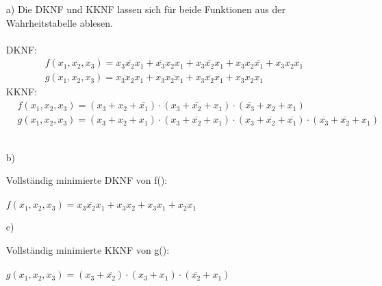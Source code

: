 \documentclass{article}
\begin{document}
	\begin{itemize}
		\item[a)] Die DKNF und KKNF lassen sich für beide Funktionen aus der Wahrheitstabelle ablesen.\\\\
		DKNF:
		\begin{align*}
			&f(x_1,x_2,x_3)=\overline{x_3x_2x_1} + \overline{x_3}x_2x_1 + x_3\overline{x_2}x_1 + x_3x_2\overline{x_1} + x_3x_2x_1 \\
			&g(x_1,x_2,x_3)=\overline{x_3x_2}x_1 + x_3\overline{x_2x_1} + x_3\overline{x_2}x_1 + x_3x_2x_1
		\end{align*}
		KKNF:
		\begin{align*}
			&f(x_1,x_2,x_3)=(x_3+ x_2+\overline{x_1}) \cdot (x_3 +\overline{x_2}+ x_1) \cdot (\overline{x_3}+ x_2 + x_1) \\
			&g(x_1,x_2,x_3)=(x_3 + x_2 + x_1) \cdot (x_3 + \overline{x_2} + x_1) \cdot (x_3 + \overline{x_2} + \overline{x_1}) \cdot (\overline{x_3} + \overline{x_2} + x_1)
		\end{align*}\\
		\item[b)]
		\begin{minipage}[t]{0.45\textwidth}
			Vollständig minimierte DKNF von f(): \\\\
			$f(x_1,x_2,x_3)=\overline{x_3x_2x_1} + x_3x_2 + x_3x_1 + x_2x_1$
		\end{minipage}
		\begin{minipage}[h]{0.5\textwidth}
			\begin{karnaugh-map}[4][2][1][$x_3x_2$][$x_1$]
				\autoterms[0]
			\end{karnaugh-map}
		\end{minipage}
		\item[c)] 
		\begin{minipage}[t]{0.45\textwidth}
			Vollständig minimierte KKNF von g(): \\\\
			$g(x_1,x_2,x_3)=(x_3 + \overline{x_2}) \cdot (x_3 + x_1) \cdot (\overline{x_2} + x_1)$
		\end{minipage}
		\begin{minipage}[h]{0.5\textwidth}
			\begin{karnaugh-map}[4][2][1][$x_3x_2$][$x_1$]
				\autoterms[1]
			\end{karnaugh-map}
		\end{minipage}
	\end{itemize}
	
\end{document}
